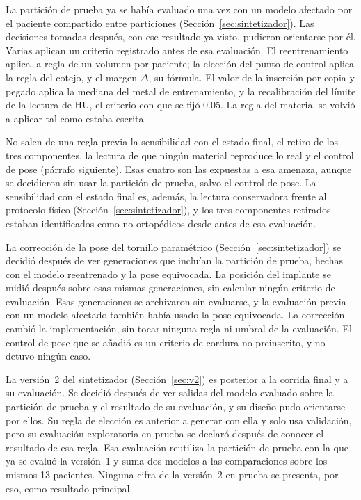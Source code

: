 La partición de prueba ya se había evaluado una vez con un modelo afectado por el paciente compartido entre particiones (Sección~\ref{sec:sintetizador}). Las decisiones tomadas después, con ese resultado ya visto, pudieron orientarse por él. Varias aplican un criterio registrado antes de esa evaluación. El reentrenamiento aplica la regla de un volumen por paciente; la elección del punto de control aplica la regla del cotejo, y el margen $\Delta$, su fórmula. El valor de la inserción por copia y pegado aplica la mediana del metal de entrenamiento, y la recalibración del límite de la lectura de HU, el criterio con que se fijó 0.05. La regla del material se volvió a aplicar tal como estaba escrita.

No salen de una regla previa la sensibilidad con el estado final, el retiro de los tres componentes, la lectura de que ningún material reproduce lo real y el control de pose (párrafo siguiente). Esas cuatro son las expuestas a esa amenaza, aunque se decidieron sin usar la partición de prueba, salvo el control de pose. La sensibilidad con el estado final es, además, la lectura conservadora frente al protocolo físico (Sección~\ref{sec:sintetizador}), y los tres componentes retirados estaban identificados como no ortopédicos desde antes de esa evaluación.

La corrección de la pose del tornillo paramétrico (Sección~\ref{sec:sintetizador}) se decidió después de ver generaciones que incluían la partición de prueba, hechas con el modelo reentrenado y la pose equivocada. La posición del implante se midió después sobre esas mismas generaciones, sin calcular ningún criterio de evaluación. Esas generaciones se archivaron sin evaluarse, y la evaluación previa con un modelo afectado también había usado la pose equivocada. La corrección cambió la implementación, sin tocar ninguna regla ni umbral de la evaluación. El control de pose que se añadió es un criterio de cordura no preinscrito, y no detuvo ningún caso.

La versión~2 del sintetizador (Sección~\ref{sec:v2}) es posterior a la corrida final y a su evaluación. Se decidió después de ver salidas del modelo evaluado sobre la partición de prueba y el resultado de su evaluación, y su diseño pudo orientarse por ellos. Su regla de elección es anterior a generar con ella y solo usa validación, pero su evaluación exploratoria en prueba se declaró después de conocer el resultado de esa regla. Esa evaluación reutiliza la partición de prueba con la que ya se evaluó la versión~1 y suma dos modelos a las comparaciones sobre los mismos 13 pacientes. Ninguna cifra de la versión~2 en prueba se presenta, por eso, como resultado principal.

